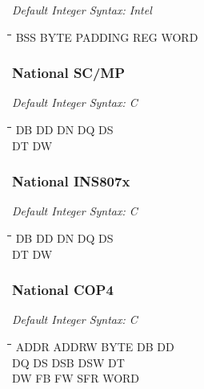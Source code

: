 {\em Default Integer Syntax: Intel}

{\tt\begin{tabbing}
\hspace{3cm}\=\hspace{3cm}\=\hspace{3cm}\=\hspace{3cm}\=\kill
BSS        \> BYTE        \> PADDING     \> REG         \> WORD \\
\end{tabbing}}

\subsubsection{National SC/MP}

{\em Default Integer Syntax: C}

{\tt\begin{tabbing}
\hspace{3cm}\=\hspace{3cm}\=\hspace{3cm}\=\hspace{3cm}\=\kill
DB         \> DD          \> DN          \> DQ          \> DS \\
DT         \> DW \\
\end{tabbing}}
	
\subsubsection{National INS807x}

{\em Default Integer Syntax: C}

{\tt\begin{tabbing}
\hspace{3cm}\=\hspace{3cm}\=\hspace{3cm}\=\hspace{3cm}\=\kill
DB         \> DD          \> DN          \> DQ          \> DS \\
DT         \> DW \\
\end{tabbing}}
        
\subsubsection{National COP4}

{\em Default Integer Syntax: C}

{\tt\begin{tabbing}
\hspace{3cm}\=\hspace{3cm}\=\hspace{3cm}\=\hspace{3cm}\=\kill
ADDR       \> ADDRW       \> BYTE        \> DB          \> DD \\
DQ         \> DS          \> DSB         \> DSW         \> DT \\
DW         \> FB          \> FW          \> SFR         \> WORD \\
\end{tabbing}}

